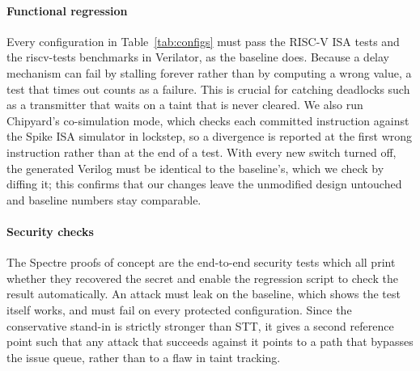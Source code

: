 
\paragraph{Functional regression}
Every configuration in Table~\ref{tab:configs} must pass the RISC-V ISA tests
and the riscv-tests benchmarks in Verilator, as the baseline does. Because a
delay mechanism can fail by stalling forever rather than by computing a wrong
value, a test that times out counts as a failure. This is crucial for catching
deadlocks such as a transmitter that waits on a taint that is never cleared. 
We also run Chipyard's co-simulation mode, which checks each committed instruction
against the Spike ISA simulator in lockstep, so a divergence is reported at
the first wrong instruction rather than at the end of a test. With every new
switch turned off, the generated Verilog must be identical to the baseline's,
which we check by diffing it; this confirms that our changes leave the
unmodified design untouched and baseline numbers stay comparable.

\paragraph{Security checks}
The Spectre proofs of concept are the end-to-end security tests which all print
whether they recovered the secret and enable the regression script to check the
result automatically. An attack must leak on the baseline, which shows the
test itself works, and must fail on every protected configuration. Since the
conservative stand-in is strictly stronger than STT, it gives a second reference point 
such that any attack that succeeds against it points to a path that bypasses the issue queue, 
rather than to a flaw in taint tracking.
